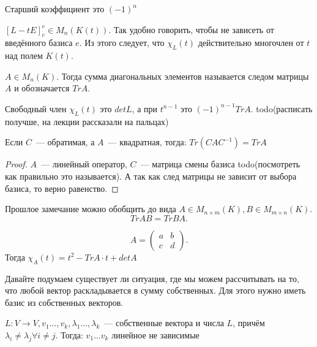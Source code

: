 \begin{remark}
    Старший коэффициент это $(-1)^n$
\end{remark}
\begin{remark}
    $[L - tE]^e_e \in M_n(K(t))$. Так удобно говорить, чтобы не зависеть от введённого базиса $e$.
    Из этого следует, что $\chi_L(t)$ действительно многочлен от $t$ над полем $K(t)$.
\end{remark}
\begin{definition}
    $A\in M_n(K)$. Тогда сумма диагональных элементов называется следом матрицы $A$ и обозначается $Tr A$.
\end{definition}
\begin{remark}
    Свободный член $\chi_L(t)$ это $det L$, а при $t^{n-1}$ это $(-1)^{n-1}Tr A$.
    todo(расписать получше, на лекции рассказали на пальцах)
\end{remark}
\begin{remark}
    Если $C$~--- обратимая, а $A$~--- квадратная, тогда:
    $Tr(CAC^{-1}) = TrA$
\end{remark}
\begin{proof}
    $A$~--- линейный оператор, $C$~--- матрица смены базиса todo(посмотреть как правильно это называется).
    А так как след матрицы не зависит от выбора базиса, то верно равенство.
\end{proof}
\begin{remark}
    Прошлое замечание можно обобщить до вида $A\in M_{n\times m}(K), B\in M_{m\times n}(K)$.
    \[
    Tr AB = Tr BA
    .\] 
\end{remark}
\begin{example}
    \[
    A = 
    \begin{pmatrix}
        a&b\\
        c&d
    \end{pmatrix}
    .\] 
    Тогда $\chi_A(t) = t^2 - Tr A\cdot t + det A$
\end{example}
\begin{motivation}
    Давайте подумаем существует ли ситуация, где мы можем рассчитывать на то, что любой вектор раскладывается в сумму собственных.
    Для этого нужно иметь базис из собственных векторов.
\end{motivation}
\begin{theorem}
    $L: V\rightarrow V, v_1\dots, v_k, \lambda_1\dots, \lambda_k$~--- собственные вектора и числа $L$, причём
    $\lambda_i\not= \lambda_j \forall i\not= j$.
    Тогда:  $v_1\dots v_k$ линейное не зависимые
\end{theorem}
